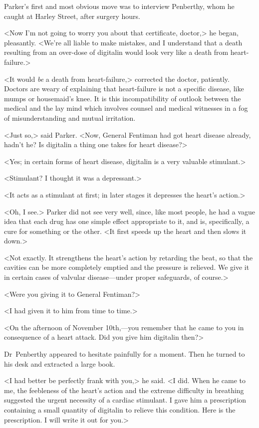 Parker's first and most obvious move was to interview Penberthy, whom he caught at Harley Street, after surgery hours.

<Now I'm not going to worry you about that certificate, doctor,> he began, pleasantly. <We're all liable to make mistakes, and I understand that a death resulting from an over-dose of digitalin would look very like a death from heart-failure.>

<It would \emph{be} a death from heart-failure,> corrected the doctor, patiently. Doctors are weary of explaining that heart-failure is not a specific disease, like mumps or housemaid's knee. It is this incompatibility of outlook between the medical and the lay mind which involves counsel and medical witnesses in a fog of misunderstanding and mutual irritation.

<Just so,> said Parker. <Now, General Fentiman had got heart disease already, hadn't he? Is digitalin a thing one takes for heart disease?>

<Yes; in certain forms of heart disease, digitalin is a very valuable stimulant.>

<Stimulant? I thought it was a depressant.>

<It acts as a stimulant at first; in later stages it depresses the heart's action.>

<Oh, I see.> Parker did not see very well, since, like most people, he had a vague idea that each drug has one simple effect appropriate to it, and is, specifically, a cure for something or the other. <It first speeds up the heart and then slows it down.>

<Not exactly. It strengthens the heart's action by retarding the beat, so that the cavities can be more completely emptied and the pressure is relieved. We give it in certain cases of valvular disease—under proper safeguards, of course.>

<Were you giving it to General Fentiman?>

<I had given it to him from time to time.>

<On the afternoon of November 10th,—you remember that he came to you in consequence of a heart attack. Did you give him digitalin then?>

Dr~Penberthy appeared to hesitate painfully for a moment. Then he turned to his desk and extracted a large book.

<I had better be perfectly frank with you,> he said. <I did. When he came to me, the feebleness of the heart's action and the extreme difficulty in breathing suggested the urgent necessity of a cardiac stimulant. I gave him a prescription containing a small quantity of digitalin to relieve this condition. Here is the prescription. I will write it out for you.>

